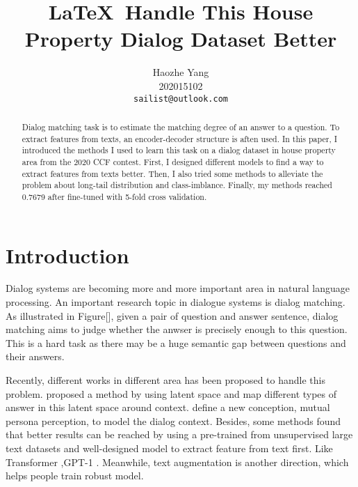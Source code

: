 \documentclass[10pt,twocolumn,letterpaper]{article}
\begin{document}
\title{\LaTeX\ Handle This House Property Dialog Dataset Better}

\author{Haozhe Yang\\
202015102\\
{\tt\small sailist@outlook.com}
}

\maketitle

\begin{abstract}
    Dialog matching task is to estimate the matching degree of an answer to a question. To extract features from texts, an encoder{-}decoder structure is aften used. In this paper, I introduced the methods I used to learn this task on a dialog dataset in house property area from the 2020 CCF contest. First, I designed different models to find a way to extract features from texts better. Then, I also tried some methods to alleviate the problem about long{-}tail distribution and class{-}imblance. Finally, my methods reached 0.7679 after fine{-}tuned with 5{-}fold cross validation.%
\end{abstract}

\section{Introduction}%

%
Dialog systems are becoming more and more important area in natural language processing. An important research topic in dialogue systems is dialog matching. As illustrated in Figure{[}{]}, given a pair of question and answer sentence, dialog matching aims to judge whether the anwser is precisely enough to this question. This is a hard task as there may be a huge semantic gap between questions and their answers.%

%
Recently, different works in different area has been proposed to handle this problem. \cite{Jointly} proposed a method by using latent space and map different types of answer in this latent space around context. \cite{You} define a new conception, mutual persona perception, to model the dialog context. Besides, some methods found that better results can be reached by using a pre{-}trained from unsupervised large text datasets and well{-}designed model to extract feature from text first. Like Transformer \cite{BERT},GPT-1 \cite{Improving}. Meanwhile, text augmentation is another direction, which helps people train robust model.%
\end{document}
